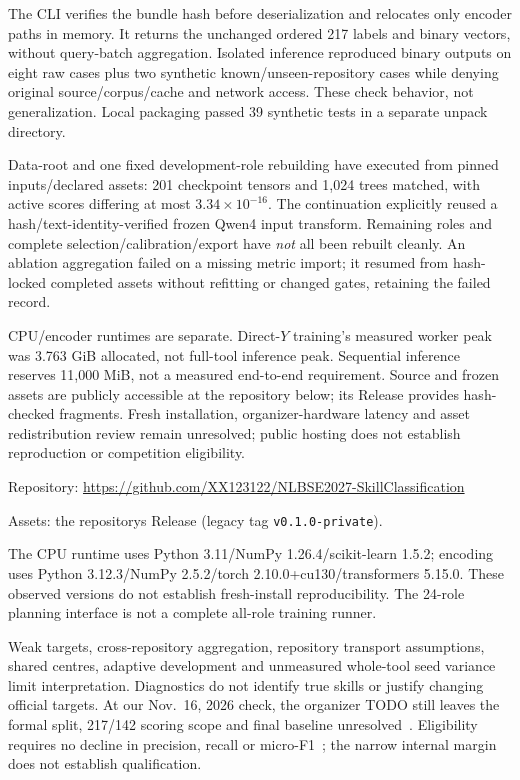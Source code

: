 \documentclass[10pt,conference]{IEEEtran}
\begin{document}
The CLI verifies the bundle hash before deserialization and relocates only encoder paths in memory. It returns the unchanged ordered 217 labels and binary vectors, without query-batch aggregation. Isolated inference reproduced binary outputs on eight raw cases plus two synthetic known/unseen-repository cases while denying original source/corpus/cache and network access. These check behavior, not generalization. Local packaging passed 39 synthetic tests in a separate unpack directory.

Data-root and one fixed development-role rebuilding have executed from pinned inputs/declared assets: 201 checkpoint tensors and 1,024 trees matched, with active scores differing at most $3.34\times10^{-16}$. The continuation explicitly reused a hash/text-identity-verified frozen Qwen4 input transform. Remaining roles and complete selection/calibration/export have \emph{not} all been rebuilt cleanly. An ablation aggregation failed on a missing metric import; it resumed from hash-locked completed assets without refitting or changed gates, retaining the failed record.

CPU/encoder runtimes are separate. Direct-$Y$ training's measured worker peak was 3.763 GiB allocated, not full-tool inference peak. Sequential inference reserves 11,000 MiB, not a measured end-to-end requirement. Source and frozen assets are publicly accessible at the repository below; its Release provides hash-checked fragments. Fresh installation, organizer-hardware latency and asset redistribution review remain unresolved; public hosting does not establish reproduction or competition eligibility.\par\begingroup\raggedright\noindent Repository: \url{https://github.com/XX123122/NLBSE2027-SkillClassification}\par\noindent Assets: the repository\textquotesingle s Release (legacy tag \texttt{v0.1.0-private}).\par\endgroup

\newpage
The CPU runtime uses Python 3.11/NumPy 1.26.4/scikit-learn 1.5.2; encoding uses Python 3.12.3/NumPy 2.5.2/torch 2.10.0+cu130/transformers 5.15.0. These observed versions do not establish fresh-install reproducibility. The 24-role planning interface is not a complete all-role training runner.

Weak targets, cross-repository aggregation, repository transport assumptions, shared centres, adaptive development and unmeasured whole-tool seed variance limit interpretation. Diagnostics do not identify true skills or justify changing official targets. At our Nov.~16, 2026 check, the organizer TODO still leaves the formal split, 217/142 scoring scope and final baseline unresolved~\cite{repository}. Eligibility requires no decline in precision, recall or micro-F1~\cite{competition}; the narrow internal margin does not establish qualification.
\end{document}
